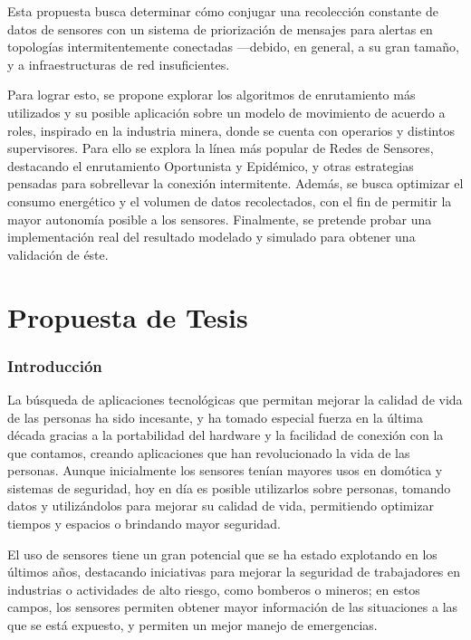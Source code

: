 \documentclass[10pt,preprint,onecolumn]{paper}
\begin{document}
Esta propuesta busca determinar cómo conjugar una recolección constante de datos de sensores con un sistema de priorización de mensajes para alertas en topologías intermitentemente conectadas ---debido, en general, a su gran tamaño, y a infraestructuras de red insuficientes.

Para lograr esto, se propone explorar los algoritmos de enrutamiento más utilizados y su posible aplicación sobre un modelo de movimiento de acuerdo a roles, inspirado en la industria minera, donde se cuenta con operarios y distintos supervisores. Para ello se explora la línea más popular de Redes de Sensores, destacando el enrutamiento Oportunista\cite{op} y Epidémico\cite{epidemic}, y otras estrategias pensadas para sobrellevar la conexión intermitente.  Además, se busca optimizar el consumo energético y el volumen de datos recolectados, con el fin de permitir la mayor autonomía posible a los sensores. Finalmente, se pretende probar una implementación real del resultado modelado y simulado para obtener una validación de éste.

\clearpage

\begin{comment}
@keywords{Wireless Sensor Network, Ad-Hoc Networking, Delay Tolerant Network, Data Mules}
\end{comment}


\part{Propuesta de Tesis}
\section{Introducción}
\label{sec:introduction}

La búsqueda de aplicaciones tecnológicas que permitan mejorar la calidad de vida de las personas ha sido incesante, y ha tomado especial fuerza en la última década gracias a la portabilidad del hardware y la facilidad de conexión con la que contamos, creando aplicaciones que han revolucionado la vida de las personas. Aunque inicialmente los sensores tenían mayores usos en domótica y sistemas de seguridad, hoy en día es posible utilizarlos sobre personas, tomando datos y utilizándolos para mejorar su calidad de vida, permitiendo optimizar tiempos y espacios o brindando mayor seguridad. 

El uso de sensores tiene un gran potencial que se ha estado explotando en los últimos años, destacando iniciativas para mejorar la seguridad de trabajadores en industrias o actividades de alto riesgo, como bomberos o mineros; en estos campos, los sensores permiten obtener mayor información de las situaciones a las que se está expuesto, y permiten un mejor manejo de emergencias. 
\end{document}
